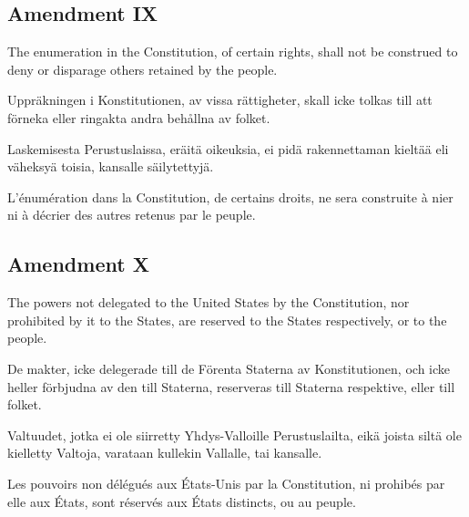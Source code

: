 \documentclass[a4,landscape,12pt]{article}
\begin{document}
\subsection*{Amendment IX}
\begin{minipage}[t]{0.22\textwidth}
The enumeration in the Constitution, of certain rights, shall not be construed to deny or disparage others retained by the people.
\end{minipage}\textwidth
\begin{minipage}[t]{0.22\textwidth}
Uppräkningen i Konstitutionen, av vissa rättigheter, skall icke tolkas till att förneka eller ringakta andra behållna av folket.
\end{minipage}\textwidth
\begin{minipage}[t]{0.22\textwidth}
Laskemisesta Perustuslaissa, eräitä oikeuksia, ei pidä rakennettaman kieltää eli väheksyä toisia, kansalle säilytettyjä.
\end{minipage}\textwidth
\begin{minipage}[t]{0.22\textwidth}
L'énumération dans la Constitution, de certains droits, ne sera construite à nier ni à décrier des autres retenus par le peuple.
\end{minipage}

\subsection*{Amendment X}
\begin{minipage}[t]{0.22\textwidth}
The powers not delegated to the United States by the Constitution, nor prohibited by it to the States, are reserved to the States respectively, or to the people.
\end{minipage}\textwidth
\begin{minipage}[t]{0.22\textwidth}
De makter, icke delegerade till de Förenta Staterna av Konstitutionen, och icke heller förbjudna av den till Staterna, reserveras till Staterna respektive, eller till folket.
\end{minipage}\textwidth
\begin{minipage}[t]{0.22\textwidth}
Valtuudet, jotka ei ole siirretty Yhdys-Valloille Perustuslailta, eikä joista siltä ole kielletty Valtoja, varataan kullekin Vallalle, tai kansalle.
\end{minipage}\textwidth
\begin{minipage}[t]{0.22\textwidth}
Les pouvoirs non délégués aux États-Unis par la Constitution, ni prohibés par elle aux États, sont réservés aux États distincts, ou au peuple.
\end{minipage}
\end{document}
